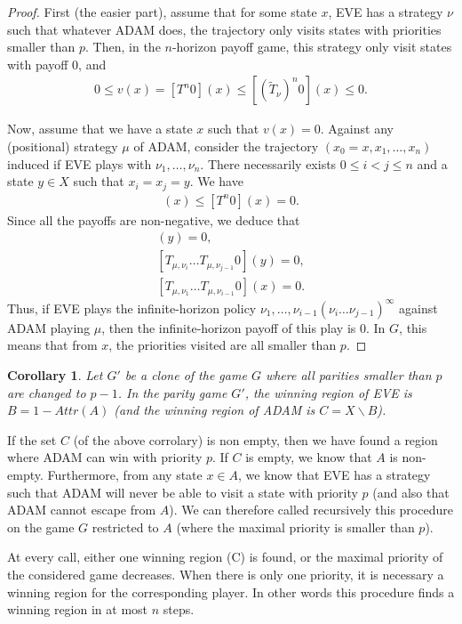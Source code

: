\documentclass{article}
\newtheorem{corollary}{Corollary}
\begin{document}
\begin{proof}
  First (the easier part), assume that for some state $x$, EVE has a strategy $\nu$ such that whatever ADAM does, the trajectory only visits states with priorities smaller than $p$. Then, in the $n$-horizon payoff game, this strategy only visit states with payoff $0$, and 
  \begin{align}
   0 \le v(x) =  [T^n0](x) \le [(\tilde T_{\nu})^n 0](x) \le 0.
  \end{align}

  Now, assume that we have a state $x$ such that $v(x)=0$. Against any (positional) strategy $\mu$ of ADAM, consider the trajectory $(x_0=x,x_1,\dots,x_n)$ induced if EVE plays with $\nu_1,\dots,\nu_n$. There necessarily exists $0 \le i<j\le n$ and a state $y \in X$ such that $x_i=x_j=y$. We have
  \begin{align}
    [T_{\mu,\nu_1} \dots T_{\mu,\nu_{i-1}} T_{\mu,\nu_i} \dots T_{\mu,\nu_{j-1}} T^{n-j}0](x) \le [T^n0](x) = 0.
  \end{align}
  Since all the payoffs are non-negative, we deduce that
  \begin{align}
    [T^{n-j}0](y)=0, \\
    [T_{\mu,\nu_i} \dots T_{\mu,\nu_{j-1}} 0](y)=0, \\
    [T_{\mu,\nu_1} \dots T_{\mu,\nu_{i-1}} 0](x)=0.
  \end{align}
  Thus, if EVE plays the infinite-horizon policy $\nu_1,\dots,\nu_{i-1}(\nu_i \dots \nu_{j-1})^\infty$ against ADAM playing $\mu$, then the infinite-horizon payoff of this play is $0$. In $G$, this means that from $x$, the priorities visited are all smaller than $p$.
\end{proof}
\begin{corollary}
Let $G'$ be a clone of the game $G$ where all parities smaller than $p$ are changed to $p-1$. In the parity game $G'$, the winning region of EVE is $B = 1-Attr(A)$ (and the winning region of ADAM is $C=X \backslash B$).
\end{corollary}
If the set $C$ (of the above corrolary) is non empty, then we have found a region where ADAM can win with priority $p$.
If $C$ is empty, we know that $A$ is non-empty.
Furthermore, from any state $x \in A$, we know that EVE has a strategy such that ADAM will never be able to visit a state with priority $p$ (and also that ADAM cannot escape from $A$). We can therefore called recursively this procedure on the game $G$ restricted to $A$ (where the maximal priority is smaller than $p$).

At every call, either one winning region (C) is found, or the maximal priority of the considered game decreases. When there is only one priority, it is necessary a winning region for the corresponding player. In other words this procedure finds a winning region in at most $n$ steps. 






 
\end{document}
